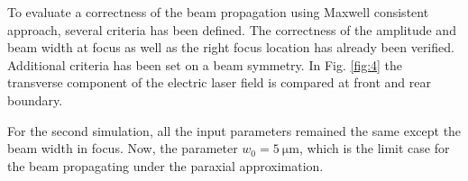 To evaluate a correctness of the beam propagation using Maxwell consistent approach, several criteria has been defined. The correctness of the amplitude and beam width at focus as well as the right focus location has already been verified. Additional criteria has been set on a beam symmetry. In Fig. \ref{fig:4} the transverse component of the electric laser field is compared at front and rear boundary.

For the second simulation, all the input parameters remained the same except the beam width in focus. Now, the parameter $ w_0 = 5 \: \mathrm{\mu m} $, which is the limit case for the beam propagating under the paraxial approximation. 

\begin{figure}[t]
	\centering
	\hspace{2mm}
	\\

\end{figure}
